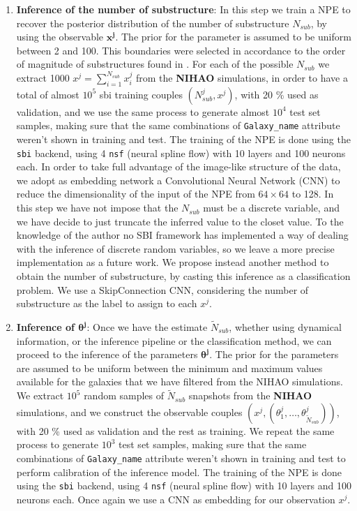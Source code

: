 \begin{enumerate}
    \item \textbf{Inference of the number of substructure}: In this step we train a NPE to recover the posterior distribution of the number of substructure $N_{sub}$, by using the observable \textbf{$\mathbf{x^j}$}. The prior for the parameter is assumed to be uniform between 2 and 100. This boundaries were selected in accordance to the order of magnitude of substructures found in \cite{deasonUnravellingMassSpectrum2023}. For each of the possible $N_{sub}$ we extract 1000  $x^j = \sum_{i=1}^{N_{sub}} x_i^j$ from the \textbf{NIHAO} simulations, in order to have a total of almost $ 10^5$ sbi training couples $(N_{sub}^j, x^j)$, with 20 \% used as validation, and we use the same process to generate almost $10^4$ test set samples, making sure that the same combinations of \texttt{Galaxy\_name} attribute weren't shown in training and test. The training of the NPE is done using the \texttt{sbi} backend, using 4 \texttt{nsf} (neural spline flow) with 10 layers and 100 neurons each. In order to take full advantage of the image-like structure of the data, we adopt as embedding network a Convolutional Neural Network (CNN) to reduce the dimensionality of the input of the NPE from $64 \times 64$ to 128. 
    In this step we have not impose that the $N_{sub}$ must be a discrete variable, and we have decide to just truncate the inferred value to the closet value. To the knowledge of the author no SBI framework has implemented a way of dealing with the inference of discrete random variables, so we leave a more precise implementation as a future work. We propose instead another method to obtain the number of substructure, by casting this inference as a classification problem. We use a SkipConnection CNN, considering the number of substructure as the label to assign to each $x^j$.

    \item \textbf{Inference of $\mathbf{\theta^j}$}: Once we have the estimate $\tilde{N}_{sub}$, whether using dynamical information, or the inference pipeline or the classification method, we can proceed to the inference of the parameters $\mathbf{\theta^j}$. The prior for the parameters are assumed to be uniform between the minimum and maximum values available for the galaxies that we have filtered from the NIHAO simulations. We extract $10^5$ random samples of $\tilde{N}_{sub}$ snapshots from the \textbf{NIHAO} simulations, and we construct the observable 
    couples $(x^j, (\theta_1^j, \dots, \theta_{\tilde{N}_{sub}}^j))$, with 20 \% used as validation and the rest as training. We repeat the same process to generate $10^3$ test set samples, making sure that the same combinations of \texttt{Galaxy\_name} attribute weren't shown in training and test to perform calibration of the inference model. The training of the NPE is done using the \texttt{sbi} backend, using 4 \texttt{nsf} (neural spline flow) with 10 layers and 100 neurons each. Once again we use a CNN as embedding for our observation $x^j$.
\end{enumerate}

